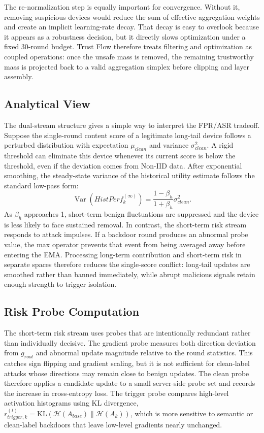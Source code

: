 \documentclass[runningheads,orivec]{llncs}
\begin{document}
The re-normalization step is equally important for convergence. Without it, removing suspicious devices would reduce the sum of effective aggregation weights and create an implicit learning-rate decay. That decay is easy to overlook because it appears as a robustness decision, but it directly slows optimization under a fixed 30-round budget. Trust Flow therefore treats filtering and optimization as coupled operations: once the unsafe mass is removed, the remaining trustworthy mass is projected back to a valid aggregation simplex before clipping and layer assembly.

\subsection{Analytical View}

The dual-stream structure gives a simple way to interpret the FPR/ASR tradeoff. Suppose the single-round content score of a legitimate long-tail device follows a perturbed distribution with expectation $\mu_{clean}$ and variance $\sigma_{clean}^2$. A rigid threshold can eliminate this device whenever its current score is below the threshold, even if the deviation comes from Non-IID data. After exponential smoothing, the steady-state variance of the historical utility estimate follows the standard low-pass form:
\begin{equation}
    \operatorname{Var}(HistPerf_k^{(\infty)})=\frac{1-\beta_h}{1+\beta_h}\sigma_{clean}^2 .
\end{equation}
As $\beta_h$ approaches 1, short-term benign fluctuations are suppressed and the device is less likely to face sustained removal. In contrast, the short-term risk stream responds to attack impulses. If a backdoor round produces an abnormal probe value, the max operator prevents that event from being averaged away before entering the EMA. Processing long-term contribution and short-term risk in separate spaces therefore reduces the single-score conflict: long-tail updates are smoothed rather than banned immediately, while abrupt malicious signals retain enough strength to trigger isolation.

\subsection{Risk Probe Computation}

The short-term risk stream uses probes that are intentionally redundant rather than individually decisive. The gradient probe measures both direction deviation from $g_{root}$ and abnormal update magnitude relative to the round statistics. This catches sign flipping and gradient scaling, but it is not sufficient for clean-label attacks whose directions may remain close to benign updates. The clean probe therefore applies a candidate update to a small server-side probe set and records the increase in cross-entropy loss. The trigger probe compares high-level activation histograms using KL divergence, $r_{trigger,k}^{(t)}=\mathrm{KL}(\mathcal{H}(A_{base})\|\mathcal{H}(A_k))$, which is more sensitive to semantic or clean-label backdoors that leave low-level gradients nearly unchanged.
\end{document}
